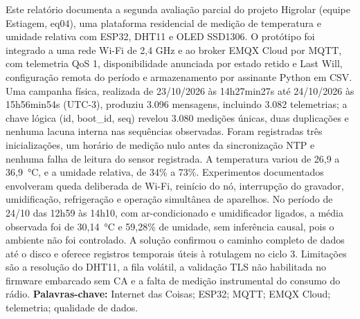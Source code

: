 \begin{resumo}
Este relatório documenta a segunda avaliação parcial do projeto Higrolar (equipe Estiagem, eq04), uma plataforma residencial de medição de temperatura e umidade relativa com ESP32, DHT11 e OLED SSD1306. O protótipo foi integrado a uma rede Wi-Fi de 2,4 GHz e ao broker EMQX Cloud por MQTT, com telemetria QoS 1, disponibilidade anunciada por estado retido e Last Will, configuração remota do período e armazenamento por assinante Python em CSV. Uma campanha física, realizada de 23/10/2026 às 14h27min27s até 24/10/2026 às 15h56min54s (UTC-3), produziu 3.096 mensagens, incluindo 3.082 telemetrias; a chave lógica (id, boot\_id, seq) revelou 3.080 medições únicas, duas duplicações e nenhuma lacuna interna nas sequências observadas. Foram registradas três inicializações, um horário de medição nulo antes da sincronização NTP e nenhuma falha de leitura do sensor registrada. A temperatura variou de 26,9 a 36,9~\si{\celsius}, e a umidade relativa, de 34\% a 73\%. Experimentos documentados envolveram queda deliberada de Wi-Fi, reinício do nó, interrupção do gravador, umidificação, refrigeração e operação simultânea de aparelhos. No período de 24/10 das 12h59 às 14h10, com ar-condicionado e umidificador ligados, a média observada foi de 30,14~\si{\celsius} e 59,28\% de umidade, sem inferência causal, pois o ambiente não foi controlado. A solução confirmou o caminho completo de dados até o disco e oferece registros temporais úteis à rotulagem no ciclo 3. Limitações são a resolução do DHT11, a fila volátil, a validação TLS não habilitada no firmware embarcado sem CA e a falta de medição instrumental do consumo do rádio.
\vspace{\onelineskip}
\noindent\textbf{Palavras-chave:} Internet das Coisas; ESP32; MQTT; EMQX Cloud; telemetria; qualidade de dados.
\end{resumo}
